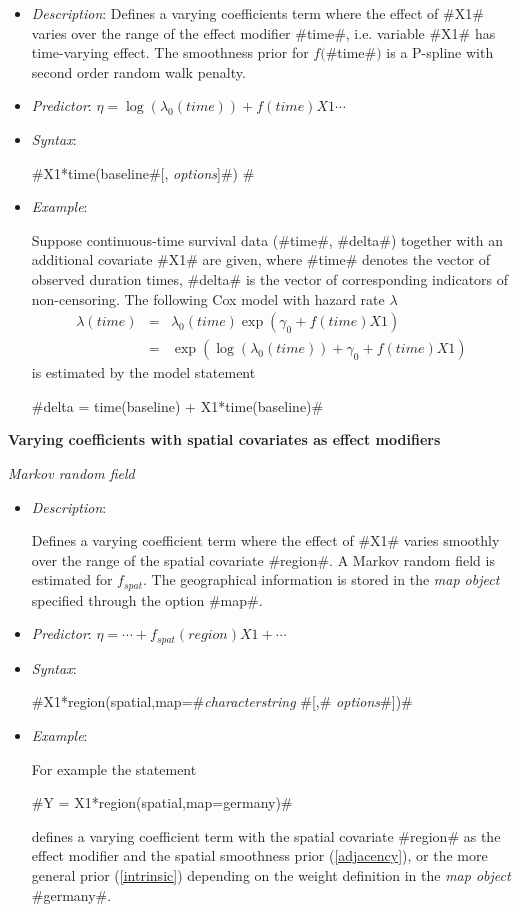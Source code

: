 \begin{itemize}
\item[] {\em Description}: Defines a varying coefficients term
where the effect of #X1# varies over the range of the effect
modifier #time#, i.e. variable #X1# has time-varying effect. The
smoothness prior for $f($#time#$)$ is a P-spline with second order
random walk penalty.

 \item[] {\em Predictor}: $\eta = \log(\lambda_0(time)) +
f(time)X1 \cdots$ \item[] {\em Syntax}:

 #X1*time(baseline#[, {\em options}]#) #
 \item[] {\em Example}:

Suppose continuous-time survival data (#time#, #delta#) together
with an additional covariate #X1# are given, where #time# denotes
the vector of observed duration times, #delta# is the vector of
corresponding indicators of non-censoring. The following Cox model
with hazard rate $\lambda$
\begin{eqnarray*}
 \lambda(time) & = & \lambda_0(time)\exp(\gamma_0 + f(time)X1)\\
 & = & \exp\left(\log(\lambda_0(time)) + \gamma_0 + f(time)X1\right)
\end{eqnarray*}
is estimated by the model statement

#delta = time(baseline) + X1*time(baseline)#

\end{itemize}


{\bf Varying coefficients with spatial covariates as effect
modifiers} \medskip

{\em Markov random field}

\begin{itemize}
\item[] {\em Description}:

Defines a varying coefficient term where the effect of #X1# varies
smoothly over the range of the spatial covariate #region#. A
Markov random field is estimated for $f_{spat}$. The geographical
information is stored in the {\em map object} specified through the
option #map#.
\item[] {\em Predictor}: $\eta = \cdots + f_{spat}(region)X1 + \cdots$
\item[] {\em Syntax}:

#X1*region(spatial,map=#{\it characterstring} #[,# {\it options}#])#
\item[] {\em Example}:

For example the statement

#Y = X1*region(spatial,map=germany)#

defines a varying coefficient term with the spatial covariate
#region# as the effect modifier and the spatial smoothness prior
(\ref{adjacency}), or the more general prior (\ref{intrinsic})
depending on the weight definition in the {\em map object} #germany#.
\end{itemize}

